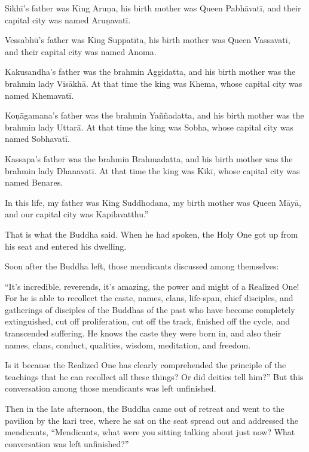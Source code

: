 \documentclass[12pt,openany]{book}%
\begin{document}
\textsanskrit{Sikhī}’s father was King \textsanskrit{Aruṇa}, his birth mother was Queen \textsanskrit{Pabhāvatī}, and their capital city was named \textsanskrit{Aruṇavatī}. 

\textsanskrit{Vessabhū}’s father was King \textsanskrit{Suppatīta}, his birth mother was Queen \textsanskrit{Vassavatī}, and their capital city was named Anoma. 

Kakusandha’s father was the brahmin Aggidatta, and his birth mother was the brahmin lady \textsanskrit{Visākhā}. At that time the king was Khema, whose capital city was named \textsanskrit{Khemavatī}. 

\textsanskrit{Koṇāgamana}’s father was the brahmin \textsanskrit{Yaññadatta}, and his birth mother was the brahmin lady \textsanskrit{Uttarā}. At that time the king was Sobha, whose capital city was named \textsanskrit{Sobhavatī}. 

Kassapa’s father was the brahmin Brahmadatta, and his birth mother was the brahmin lady \textsanskrit{Dhanavatī}. At that time the king was \textsanskrit{Kikī}, whose capital city was named Benares. 

In this life, my father was King Suddhodana, my birth mother was Queen \textsanskrit{Māyā}, and our capital city was Kapilavatthu.” 

That is what the Buddha said. When he had spoken, the Holy One got up from his seat and entered his dwelling. 

Soon after the Buddha left, those mendicants discussed among themselves: 

“It’s incredible, reverends, it’s amazing, the power and might of a Realized One! For he is able to recollect the caste, names, clans, life-span, chief disciples, and gatherings of disciples of the Buddhas of the past who have become completely extinguished, cut off proliferation, cut off the track, finished off the cycle, and transcended suffering. He knows the caste they were born in, and also their names, clans, conduct, qualities, wisdom, meditation, and freedom. 

Is it because the Realized One has clearly comprehended the principle of the teachings that he can recollect all these things? Or did deities tell him?” But this conversation among those mendicants was left unfinished. 

Then in the late afternoon, the Buddha came out of retreat and went to the pavilion by the kari tree, where he sat on the seat spread out and addressed the mendicants, “Mendicants, what were you sitting talking about just now? What conversation was left unfinished?” 
\end{document}
